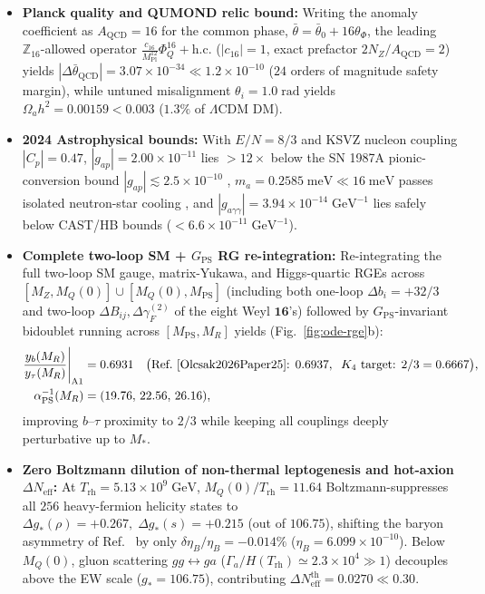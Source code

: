 \documentclass[11pt,a4paper]{article}
\begin{document}
\begin{itemize}[leftmargin=1.8em,itemsep=2pt]
\item \textbf{Planck quality and QUMOND relic bound:} Writing the anomaly coefficient as $A_{\mathrm{QCD}}=16$ for the common phase, $\bar\theta=\bar\theta_0+16\theta_\Phi$, the leading $\mathbb{Z}_{16}$-allowed operator $\frac{c_{16}}{M_{\mathrm{Pl}}^{12}}\Phi_Q^{16} + \mathrm{h.c.}$ ($|c_{16}|=1$, exact prefactor $2 N_Z/A_{\mathrm{QCD}} = 2$) yields $|\Delta\bar{\theta}_{\mathrm{QCD}}| = 3.07\times 10^{-34} \ll 1.2\times 10^{-10}$ ($24$ orders of magnitude safety margin), while untuned misalignment $\theta_i = 1.0\;\mathrm{rad}$ yields $\Omega_a h^2 = 0.00159 < 0.003$ ($1.3\%$ of $\Lambda\mathrm{CDM}$ DM).
\item \textbf{2024 Astrophysical bounds:} With $E/N = 8/3$ and KSVZ nucleon coupling $|C_p| = 0.47$, $|g_{ap}| = 2.00\times 10^{-11}$ lies $>12\times$ below the SN 1987A pionic-conversion bound $|g_{ap}| \lesssim 2.5\times 10^{-10}$ \cite{Carenza2021SN,Lella2024SN}, $m_a = 0.2585\;\mathrm{meV} \ll 16\;\mathrm{meV}$ passes isolated neutron-star cooling \cite{Buschmann2022NS}, and $|g_{a\gamma\gamma}| = 3.94\times 10^{-14}\;\mathrm{GeV}^{-1}$ lies safely below CAST/HB bounds ($< 6.6\times 10^{-11}\;\mathrm{GeV}^{-1}$).
\item \textbf{Complete two-loop SM + $G_{\mathrm{PS}}$ RG re-integration:} Re-integrating the full two-loop SM gauge, matrix-Yukawa, and Higgs-quartic RGEs \cite{MachacekVaughn1984,LuoXiao2003,Buttazzo2013} across $[M_Z, M_Q(0)] \cup [M_Q(0), M_{\mathrm{PS}}]$ (including both one-loop $\Delta b_i = +32/3$ and two-loop $\Delta B_{ij}, \Delta\gamma_F^{(2)}$ of the eight Weyl $\mathbf{16}$'s) followed by $G_{\mathrm{PS}}$-invariant bidoublet running across $[M_{\mathrm{PS}}, M_R]$ yields (Fig.~\ref{fig:ode-rge}b):
\begin{equation}
\begin{aligned}
\frac{y_b(M_R)}{y_\tau(M_R)}\Bigg|_{\mathrm{A1}} &= 0.6931 \quad \big(\text{Ref.~\cite{Olcsak2026Paper25}: } 0.6937,\;\; K_4\text{ target: } 2/3 = 0.6667\big), \\
\alpha_{\mathrm{PS}}^{-1}(M_R) &= (19.76,\, 22.56,\, 26.16),
\end{aligned}
\label{eq:A1-rge}
\end{equation}
improving $b\text{--}\tau$ proximity to $2/3$ while keeping all couplings deeply perturbative up to $M_*$.
\item \textbf{Zero Boltzmann dilution of non-thermal leptogenesis and hot-axion $\Delta N_{\mathrm{eff}}$:} At $T_{\mathrm{rh}} = 5.13\times 10^9\;\mathrm{GeV}$, $M_Q(0)/T_{\mathrm{rh}} = 11.64$ Boltzmann-suppresses all $256$ heavy-fermion helicity states to $\Delta g_*(\rho) = +0.267,\; \Delta g_*(s) = +0.215$ (out of $106.75$), shifting the baryon asymmetry of Ref.~\cite{Olcsak2026Paper24} by only $\delta\eta_B/\eta_B = -0.014\%$ ($\eta_B = 6.099\times 10^{-10}$). Below $M_Q(0)$, gluon scattering $gg \leftrightarrow ga$ \cite{SalvioStrumiaWetterich2014,NotariRompineveVilladoro2023} ($\Gamma_a/H(T_{\mathrm{rh}}) \simeq 2.3\times 10^4 \gg 1$) decouples above the EW scale ($g_* = 106.75$), contributing $\Delta N_{\mathrm{eff}}^{\mathrm{th}} = 0.0270 \ll 0.30$.
\end{itemize}
\end{document}
